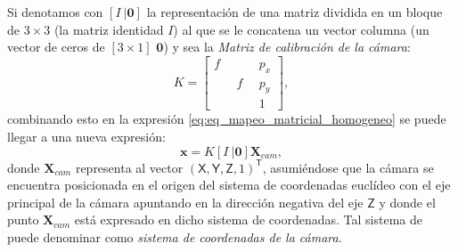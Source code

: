 Si denotamos con $[I\:|\mathbf{0}]$ la representación de una matriz dividida en un bloque de $3 \times 3$ (la matriz identidad $I$) al que se le concatena un vector columna (un vector de ceros de $[3 \times 1]$ $\mathbf{0}$) y sea la \textit{Matriz de calibración de la cámara}:
\begin{equation}
  \label{eq:k}
  K=\left[\begin{array}{ccc}
	    f & \quad & p_x \\
	    \quad & f & p_y \\
	    \quad & \quad & 1
	  \end{array}\right],
\end{equation}
combinando esto en la expresión \ref{eq:eq_mapeo_matricial_homogeneo} se puede llegar a una nueva expresión:
\begin{equation}
\label{eq:mapp_xcam}
\mathbf{x}=K[I\:|\mathbf{0}]\mathbf{X}_{cam},
\end{equation}
donde $\mathbf{X}_{cam}$ %
representa al vector $(\mathsf{X},\mathsf{Y},\mathsf{Z},1)^\mathsf{T}$, asumiéndose que la cámara se encuentra posicionada en el origen del sistema de coordenadas euclídeo con el eje principal de la cámara apuntando en la dirección negativa del eje $\mathsf{Z}$ y donde el punto $\mathbf{X}_{cam}$ está expresado en dicho sistema de coordenadas. Tal sistema de puede denominar como \textit{sistema de coordenadas de la cámara}.


